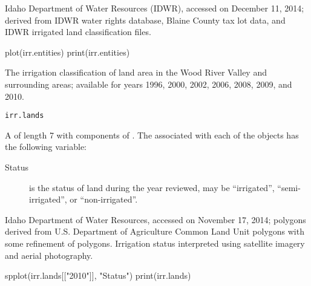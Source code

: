 \documentclass[a4paper]{book}
\begin{document}
%
\begin{Source}\relax
Idaho Department of Water Resources (IDWR), accessed on December 11, 2014;
derived from IDWR water rights database, Blaine County tax lot data, and IDWR irrigated land classification files.
\end{Source}
%
\begin{Examples}
\begin{ExampleCode}
plot(irr.entities)
print(irr.entities)
\end{ExampleCode}
\end{Examples}
%
\begin{Description}\relax
The irrigation classification of land area in the Wood River Valley and surrounding areas; available for years 1996, 2000, 2002, 2006, 2008, 2009, and 2010.
\end{Description}
%
\begin{Usage}
\begin{verbatim}
irr.lands
\end{verbatim}
\end{Usage}
%
\begin{Format}
A  of length 7 with components of .
The  associated with each of the  objects has the following variable:
\begin{description}

\item[Status] is the status of land during the year reviewed, may be ``irrigated'', ``semi-irrigated'', or ``non-irrigated''.

\end{description}

\end{Format}
%
\begin{Source}\relax
Idaho Department of Water Resources, accessed on November 17, 2014;
polygons derived from U.S. Department of Agriculture Common Land Unit polygons with some refinement of polygons.
Irrigation status interpreted using satellite imagery and aerial photography.
\end{Source}
%
\begin{SeeAlso}\relax
{}
\end{SeeAlso}
%
\begin{Examples}
\begin{ExampleCode}
spplot(irr.lands[["2010"]], "Status")
print(irr.lands)
\end{ExampleCode}
\end{Examples}
\end{document}

